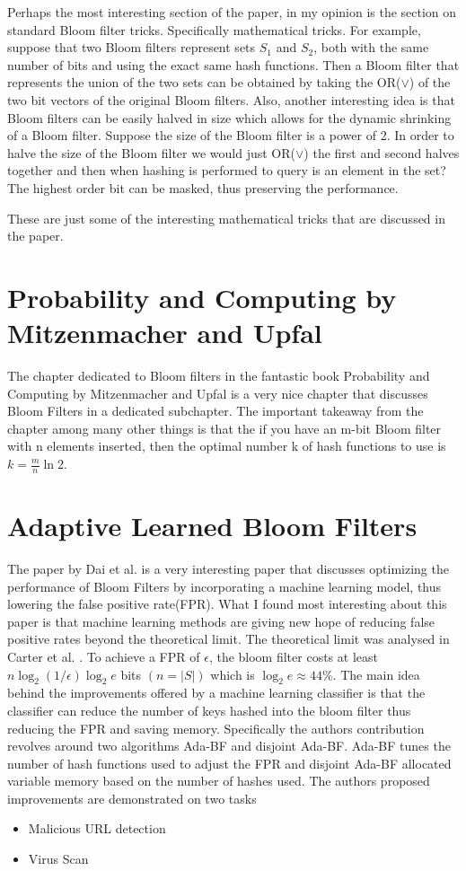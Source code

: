 \documentclass[MScCS]{uccthesis}
\begin{document}
Perhaps the most interesting section of the paper, in my opinion is the section on standard Bloom filter tricks. Specifically mathematical tricks. For example, suppose that two Bloom filters represent sets $S_1$ and $S_2$, both with the same number of bits and using the exact same hash functions. Then a Bloom filter that represents the union of the two sets can be obtained by taking the OR($\lor$) of the two bit vectors of the original Bloom filters. Also, another interesting idea is that Bloom filters can be easily halved in size which allows for the dynamic shrinking of a Bloom filter. Suppose the size of the Bloom filter is a power of 2. In order to halve the size of the Bloom filter we would just OR($\lor$) the first and second halves together and then when hashing is performed to query is an element in the set? The highest order bit can be masked, thus preserving the performance.

These are just some of the interesting mathematical tricks that are discussed in the paper.


\section{Probability and Computing by Mitzenmacher and Upfal}
The chapter dedicated to Bloom filters in the fantastic book Probability and Computing by Mitzenmacher and Upfal \cite{mitzenmacher2017probability} is a very nice chapter that discusses Bloom Filters in a dedicated subchapter. The important takeaway from the chapter among many other things is that the if you have an m-bit Bloom filter with n elements inserted, then the optimal number k of hash functions to use is $k = \frac{m}{n}\ln 2$.

\section{Adaptive Learned Bloom Filters}
The paper by Dai et al. \cite{dai2019adaptive} is a very interesting paper that discusses optimizing the performance of Bloom Filters by incorporating a machine learning model, thus lowering the false positive rate(FPR). What I found most interesting about this paper is that machine learning methods are giving new hope of reducing false positive rates beyond the theoretical limit. The theoretical limit was analysed in Carter et al. \cite{carter1978exact}. To achieve a FPR of $ \epsilon $, the bloom filter costs at least $ n \log_2 (1/\epsilon)\log_2 e$ bits $(n = |S|)$ which is $\log_2 e \approx 44\%$. The main idea behind the improvements offered by a machine learning classifier is that the classifier can reduce the number of keys hashed into the bloom filter thus reducing the FPR and saving memory. Specifically the authors contribution revolves around two algorithms Ada-BF and disjoint Ada-BF. Ada-BF tunes the number of hash functions used to adjust the FPR and disjoint Ada-BF allocated variable memory based on the number of hashes used. The authors proposed improvements are demonstrated on two tasks
\begin{itemize}
    \item Malicious URL detection
    \item Virus Scan
\end{itemize}
\end{document}
